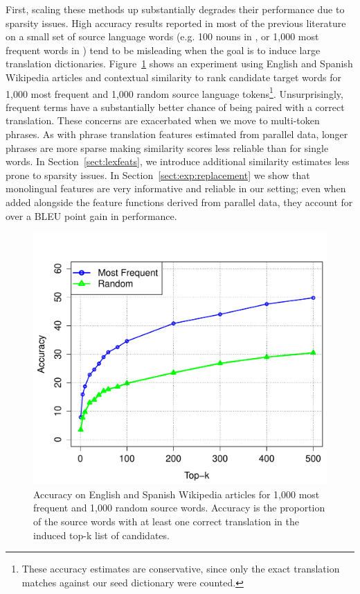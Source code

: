 \documentclass[11pt]{article}
\newcommand{\secref}[1]{Section~\ref{#1}}
\newcommand{\figref}[1]{Figure~\ref{#1}}
\begin{document}
First, scaling these methods up substantially degrades their performance due to sparsity issues. High accuracy results reported in most of the previous literature on a small set of source language words (e.g. 100 nouns in , or 1,000 most frequent words in \cite{Koehn:2002}) tend to be misleading when the goal is to induce large translation dictionaries. \figref{fig:lexinduct} shows an experiment using English and Spanish Wikipedia articles and contextual similarity to rank candidate target words for 1,000 most frequent and 1,000 random source language tokens\footnote{These accuracy estimates are conservative, since only the exact translation matches against our seed dictionary were counted.}.  Unsurprisingly, frequent terms have a substantially better chance of being paired with a correct translation.  These concerns are exacerbated when we move to multi-token phrases.  As with phrase translation features estimated from parallel data, longer phrases are more sparse making similarity scores less reliable than for single words.  In \secref{sect:lexfeats}, we introduce additional similarity estimates less prone to sparsity issues.  In \secref{sect:exp:replacement} we show that monolingual features are very informative and reliable in our setting; even when added alongside the feature functions derived from parallel data, they account for over a BLEU point gain in performance.

\begin{figure}[t]
\begin{center}
\includegraphics[width=\linewidth]{../figures/lexinduct/lexinduct.pdf}
\caption{Accuracy on English and Spanish Wikipedia articles for 1,000 most frequent and 1,000 random source words.  Accuracy is the proportion of the source words with at least one correct translation in the induced top-k list of candidates.}
\label{fig:lexinduct}
\end{center}
\vskip -0.2in
\end{figure}
\end{document}
